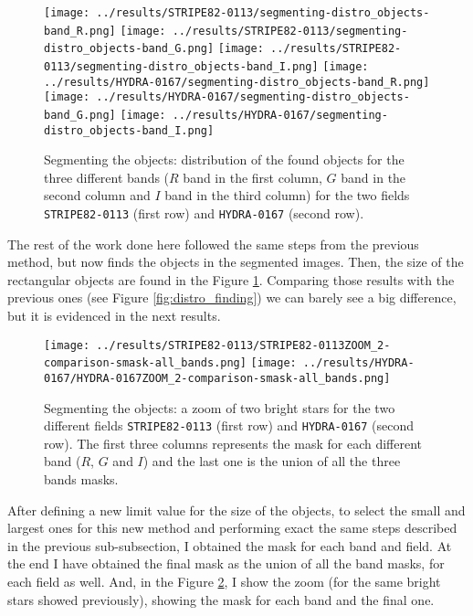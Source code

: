 \documentclass{article}
\begin{document}
\begin{figure}[h!]
  \centering
  \texttt{[image: ../results/STRIPE82-0113/segmenting-distro\_objects-band\_R.png]}
  \texttt{[image: ../results/STRIPE82-0113/segmenting-distro\_objects-band\_G.png]}
  \texttt{[image: ../results/STRIPE82-0113/segmenting-distro\_objects-band\_I.png]}
  \texttt{[image: ../results/HYDRA-0167/segmenting-distro\_objects-band\_R.png]}
  \texttt{[image: ../results/HYDRA-0167/segmenting-distro\_objects-band\_G.png]}
  \texttt{[image: ../results/HYDRA-0167/segmenting-distro\_objects-band\_I.png]}
  \caption{Segmenting the objects: distribution of the found objects for the three different bands ($R$ band in the first column, $G$ band in the second column and $I$ band in the third column) for the two fields \texttt{STRIPE82-0113} (first row) and \texttt{HYDRA-0167} (second row).}
  \label{fig:distro_segmenting}
\end{figure}

The rest of the work done here followed the same steps from the previous method, but now finds the objects in the segmented images. Then, the size of the rectangular objects are found in the Figure \ref{fig:distro_segmenting}. Comparing those results with the previous ones (see Figure \ref{fig:distro_finding}) we can barely see a big difference, but it is evidenced in the next results.

\begin{figure}[h!]
  \centering
  \texttt{[image: ../results/STRIPE82-0113/STRIPE82-0113ZOOM\_2-comparison-smask-all\_bands.png]}
  \texttt{[image: ../results/HYDRA-0167/HYDRA-0167ZOOM\_2-comparison-smask-all\_bands.png]}
  \caption{Segmenting the objects: a zoom of two bright stars for the two different fields \texttt{STRIPE82-0113} (first row) and \texttt{HYDRA-0167} (second row). The first three columns represents the mask for each different band ($R$, $G$ and $I$) and the last one is the union of all the three bands masks.}
  \label{fig:zoom_mask_segmenting}
\end{figure}

After defining a new limit value for the size of the objects, to select the small and largest ones for this new method and performing exact the same steps described in the previous sub-subsection, I obtained the mask for each band and field. At the end I have obtained the final mask as the union of all the band masks, for each field as well. And, in the Figure \ref{fig:zoom_mask_segmenting}, I show the zoom (for the same bright stars showed previously), showing the mask for each band and the final one.
\end{document}
